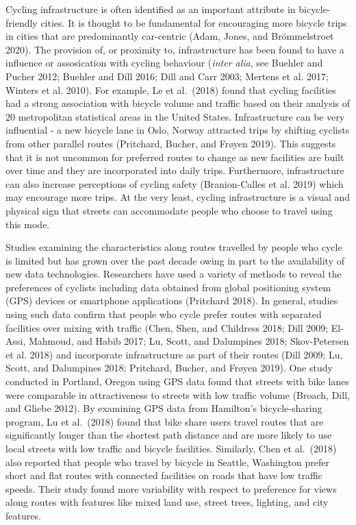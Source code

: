 \documentclass[smallextended]{svjour3}       %
\begin{document}
Cycling infrastructure is often identified as an important attribute in
bicycle-friendly cities. It is thought to be fundamental for encouraging
more bicycle trips in cities that are predominantly car-centric (Adam,
Jones, and Brömmelstroet 2020). The provision of, or proximity to,
infrastructure has been found to have a influence or assosication with
cycling behaviour (\emph{inter alia}, see Buehler and Pucher 2012;
Buehler and Dill 2016; Dill and Carr 2003; Mertens et al. 2017; Winters
et al. 2010). For example, Le et al.~(2018) found that cycling
facilities had a strong association with bicycle volume and traffic
based on their analysis of 20 metropolitan statistical areas in the
United States. Infrastructure can be very influential - a new bicycle
lane in Oslo, Norway attracted trips by shifting cyclists from other
parallel routes (Pritchard, Bucher, and Frøyen 2019). This suggests that
it is not uncommon for preferred routes to change as new facilities are
built over time and they are incorporated into daily trips. Furthermore,
infrastructure can also increase perceptions of cycling safety
(Branion-Calles et al. 2019) which may encourage more trips. At the very
least, cycling infrastructure is a visual and physical sign that streets
can accommodate people who choose to travel using this mode.

Studies examining the characteristics along routes travelled by people
who cycle is limited but has grown over the past decade owing in part to
the availability of new data technologies. Researchers have used a
variety of methods to reveal the preferences of cyclists including data
obtained from global positioning system (GPS) devices or smartphone
applications (Pritchard 2018). In general, studies using such data
confirm that people who cycle prefer routes with separated facilities
over mixing with traffic (Chen, Shen, and Childress 2018; Dill 2009;
El-Assi, Mahmoud, and Habib 2017; Lu, Scott, and Dalumpines 2018;
Skov-Petersen et al. 2018) and incorporate infrastructure as part of
their routes (Dill 2009; Lu, Scott, and Dalumpines 2018; Pritchard,
Bucher, and Frøyen 2019). One study conducted in Portland, Oregon using
GPS data found that streets with bike lanes were comparable in
attractiveness to streets with low traffic volume (Broach, Dill, and
Gliebe 2012). By examining GPS data from Hamilton's bicycle-sharing
program, Lu et al.~(2018) found that bike share users travel routes that
are significantly longer than the shortest path distance and are more
likely to use local streets with low traffic and bicycle facilities.
Similarly, Chen et al.~(2018) also reported that people who travel by
bicycle in Seattle, Washington prefer short and flat routes with
connected facilities on roads that have low traffic speeds. Their study
found more variability with respect to preference for views along routes
with features like mixed land use, street trees, lighting, and city
features.
\end{document}
